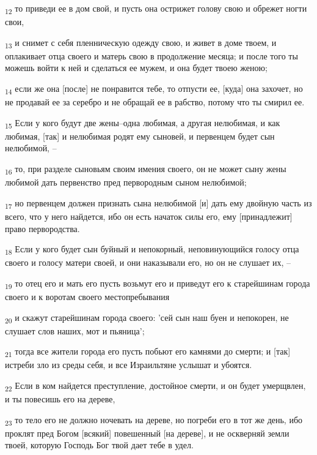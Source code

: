 \begin{tcolorbox}
\textsubscript{12} то приведи ее в дом свой, и пусть она острижет голову свою и обрежет ногти свои,
\end{tcolorbox}
\begin{tcolorbox}
\textsubscript{13} и снимет с себя пленническую одежду свою, и живет в доме твоем, и оплакивает отца своего и матерь свою в продолжение месяца; и после того ты можешь войти к ней и сделаться ее мужем, и она будет твоею женою;
\end{tcolorbox}
\begin{tcolorbox}
\textsubscript{14} если же она [после] не понравится тебе, то отпусти ее, [куда] она захочет, но не продавай ее за серебро и не обращай ее в рабство, потому что ты смирил ее.
\end{tcolorbox}
\begin{tcolorbox}
\textsubscript{15} Если у кого будут две жены--одна любимая, а другая нелюбимая, и как любимая, [так] и нелюбимая родят ему сыновей, и первенцем будет сын нелюбимой, --
\end{tcolorbox}
\begin{tcolorbox}
\textsubscript{16} то, при разделе сыновьям своим имения своего, он не может сыну жены любимой дать первенство пред первородным сыном нелюбимой;
\end{tcolorbox}
\begin{tcolorbox}
\textsubscript{17} но первенцем должен признать сына нелюбимой [и] дать ему двойную часть из всего, что у него найдется, ибо он есть начаток силы его, ему [принадлежит] право первородства.
\end{tcolorbox}
\begin{tcolorbox}
\textsubscript{18} Если у кого будет сын буйный и непокорный, неповинующийся голосу отца своего и голосу матери своей, и они наказывали его, но он не слушает их, --
\end{tcolorbox}
\begin{tcolorbox}
\textsubscript{19} то отец его и мать его пусть возьмут его и приведут его к старейшинам города своего и к воротам своего местопребывания
\end{tcolorbox}
\begin{tcolorbox}
\textsubscript{20} и скажут старейшинам города своего: 'сей сын наш буен и непокорен, не слушает слов наших, мот и пьяница';
\end{tcolorbox}
\begin{tcolorbox}
\textsubscript{21} тогда все жители города его пусть побьют его камнями до смерти; и [так] истреби зло из среды себя, и все Израильтяне услышат и убоятся.
\end{tcolorbox}
\begin{tcolorbox}
\textsubscript{22} Если в ком найдется преступление, достойное смерти, и он будет умерщвлен, и ты повесишь его на дереве,
\end{tcolorbox}
\begin{tcolorbox}
\textsubscript{23} то тело его не должно ночевать на дереве, но погреби его в тот же день, ибо проклят пред Богом [всякий] повешенный [на дереве], и не оскверняй земли твоей, которую Господь Бог твой дает тебе в удел.
\end{tcolorbox}
